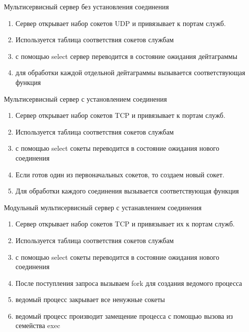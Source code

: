 \begin{frame}{Мультисервисный сервер без установления соединения}
	\begin{enumerate}
		\item Сервер открывает набор сокетов UDP и привязывает к портам служб.
		\item Используется таблица соответствия сокетов службам
		\item с помощью select сервер переводится в состояние ожидания дейтаграммы
		\item для обработки каждой отдельной дейтаграммы вызывается соответствующая функция
	\end{enumerate}
\end{frame}

\begin{frame}{Мультисервисный сервер с установлением соединения}
	\begin{enumerate}
		\item Сервер открывает набор сокетов TCP и привязывает к портам служб.
		\item Используется таблица соответствия сокетов службам
		\item с помощью select сокеты переводится в состояние ожидания нового соединения
		\item Если готов один из первоначальных сокетов,  то создаем новый сокет.
		\item Для обработки каждого соединения вызывается соответствующая функция
	\end{enumerate}
\end{frame}

\begin{frame}{Модульный мультисервисный сервер с устанавлением соединения}
	\begin{enumerate}
		\item Сервер открывает набор сокетов TCP и привязывает их к портам служб.
		\item Используется таблица соответствия сокетов службам
		\item с помощью select сокеты переводится в состояние ожидания нового соединения
		\item После поступления запроса вызываем fork для создания ведомого процесса
		\item ведомый процесс закрывает все ненужные сокеты
		\item ведомый процесс производит замещение процесса с помощью вызова из семейства exec
	\end{enumerate}
\end{frame}


